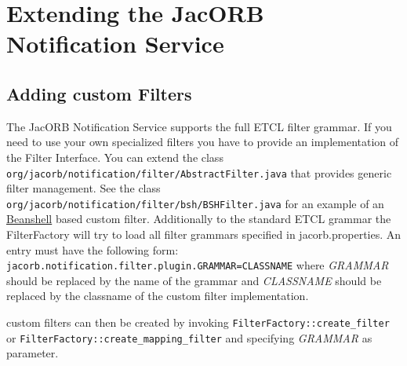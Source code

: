 \section{Extending the JacORB Notification Service}
\subsection{Adding custom Filters}

The JacORB Notification Service supports the full ETCL filter grammar. If you need to use your own specialized filters you have to provide an implementation of the Filter Interface. You can extend the class
\texttt{org/jacorb/notification/filter/AbstractFilter.java} that provides generic filter management. 
See the class \texttt{org/jacorb/notification/filter/bsh/BSHFilter.java} for an example of an \href{http://www.beanshell.org/}{Beanshell} based custom filter.
Additionally to the standard ETCL grammar the FilterFactory will try to
load all filter grammars specified in jacorb.properties.
An entry must have the following form:
\texttt{jacorb.notification.filter.plugin.GRAMMAR=CLASSNAME} where \emph{GRAMMAR} should be replaced by the name of the grammar and \emph{CLASSNAME} should be replaced by the classname of the custom filter implementation.

custom filters can then be created by invoking \texttt{FilterFactory::create\_filter} or \texttt{FilterFactory::create\_mapping\_filter} and specifying \emph{GRAMMAR} as parameter.
 
 
 
